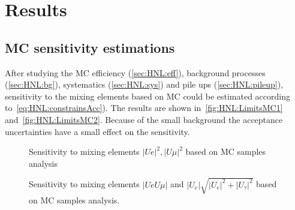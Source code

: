 \documentclass[../main.tex]{subfiles}
\begin{document}
\chapter{Results}
\section{MC sensitivity estimations}
\label{sec:HNL:MCres}

After studying the MC efficiency (\autoref{sec:HNL:eff}), background processes (\autoref{sec:HNL:bg}), systematics (\autoref{sec:HNL:sys}) and pile ups (\autoref{sec:HNL:pileup}),  sensitivity to the mixing elements based on MC could be estimated according to~\autoref{eq:HNL:constrainsAcc}). The results are shown in~\autoref{fig:HNL:LimitsMC1} and~\autoref{fig:HNL:LimitsMC2}. Because of the small background the acceptance uncertainties have a small effect on the sensitivity.

\begin{figure}[!ht]
    \begin{center}
  \begin{minipage}{0.49\linewidth}
  \end{minipage}
  \hfill
  \begin{minipage}{0.49\linewidth}
  \end{minipage}
  \caption{Sensitivity to mixing elements $\left|Ue\right|^2, \left|U\mu\right|^2$ based on MC samples analysis}
  \label{fig:HNL:LimitsMC1}
    \end{center}
\end{figure}

\begin{figure}[!ht]
    \begin{center}
  \begin{minipage}{0.49\linewidth}
  \end{minipage}
  \begin{minipage}{0.49\linewidth}
  \end{minipage}
  \caption{Sensitivity to mixing elements $\left|UeU\mu\right|$ and $\left|U_{e}\right|\sqrt{\left|U_{e}\right|^2+\left|U_{\tau}\right|^2}$ based on MC samples analysis.}
  \label{fig:HNL:LimitsMC2}
  \end{center}
\end{figure}
\end{document}
